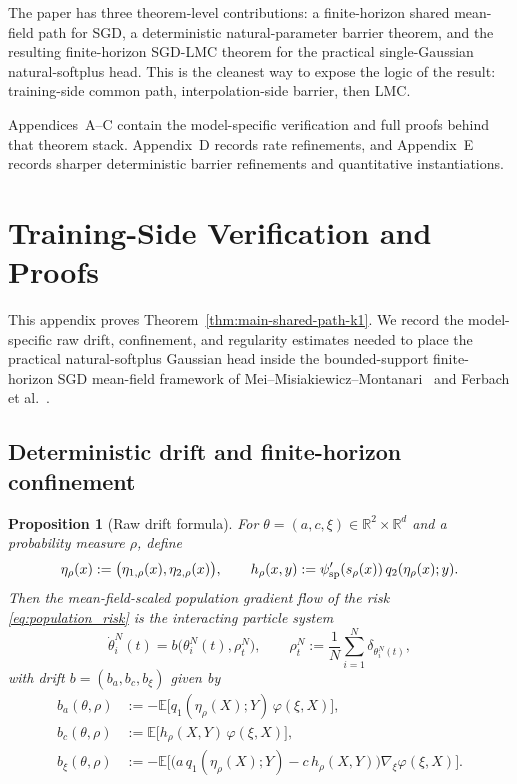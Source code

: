 \documentclass[11pt]{article}
\newtheorem{proposition}[theorem]{Proposition}
\theoremstyle{definition}
\newcommand{\R}{\mathbb{R}}
\newcommand{\E}{\mathbb{E}}
\begin{document}
The paper has three theorem-level contributions: a finite-horizon shared
mean-field path for SGD, a deterministic natural-parameter barrier theorem, and
the resulting finite-horizon SGD-LMC theorem for the practical single-Gaussian
natural-softplus head. This is the cleanest way to expose the logic of the
result: training-side common path, interpolation-side barrier, then LMC.

Appendices~A--C contain the model-specific verification and full proofs behind
that theorem stack. Appendix~D records rate refinements, and Appendix~E records
sharper deterministic barrier refinements and quantitative instantiations.

\appendix

\section{Training-Side Verification and Proofs}

This appendix proves Theorem~\ref{thm:main-shared-path-k1}. We record the
model-specific raw drift, confinement, and regularity estimates needed to place
the practical natural-softplus Gaussian head inside the bounded-support
finite-horizon SGD mean-field framework of
Mei--Misiakiewicz--Montanari~\cite{MeiMisiakiewiczMontanari2019} and
Ferbach et al.~\cite{Ferbach2024}.

\subsection{Deterministic drift and finite-horizon confinement}

\begin{proposition}[Raw drift formula]
\label{prop:softplus-raw-drift-k1}
For $\theta=(a,c,\xi)\in\R^2\times\R^d$ and a probability measure $\rho$,
define
\[
  \eta_\rho(x)
  :=
  \bigl(\eta_{1,\rho}(x),\eta_{2,\rho}(x)\bigr),
  \qquad
  h_\rho(x,y)
  :=
  \psi_{\rm sp}'(s_\rho(x))\,q_2(\eta_\rho(x);y).
\]
Then the mean-field-scaled population gradient flow of the risk
\eqref{eq:population_risk} is the interacting particle system
\begin{equation}
  \dot\theta_i^N(t)
  =
  b\bigl(\theta_i^N(t),\rho_t^N\bigr),
  \qquad
  \rho_t^N:=\frac1N\sum_{i=1}^N \delta_{\theta_i^N(t)},
  \label{eq:particle-system-k1}
\end{equation}
with drift $b=(b_a,b_c,b_\xi)$ given by
\begin{align}
  b_a(\theta,\rho)
  &:=
  -
  \E\big[q_1(\eta_\rho(X);Y)\,\varphi(\xi,X)\big],
  \label{eq:drift-a-k1}
  \\
  b_c(\theta,\rho)
  &:=
  \E\big[h_\rho(X,Y)\,\varphi(\xi,X)\big],
  \label{eq:drift-c-k1}
  \\
  b_\xi(\theta,\rho)
  &:=
  -
  \E\Big[
    \big(a\,q_1(\eta_\rho(X);Y)-c\,h_\rho(X,Y)\big)\nabla_\xi\varphi(\xi,X)
  \Big].
  \label{eq:drift-xi-k1}
\end{align}
\end{proposition}
\end{document}
